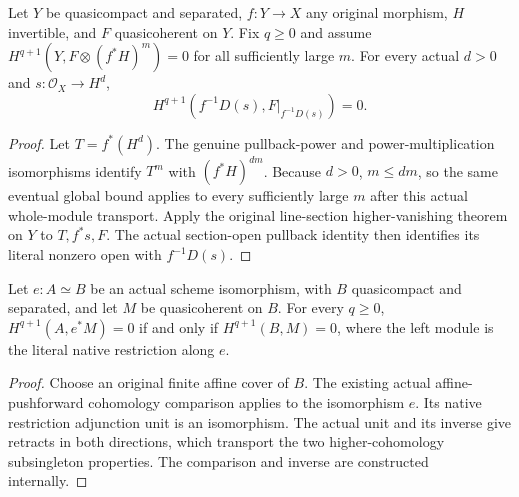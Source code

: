\begin{theorem}
\label{thm:proj-affine-positive-section-inverse-vanishing}
\leanok
Let $Y$ be quasicompact and separated, $f:Y\to X$ any original
morphism, $H$ invertible, and $F$ quasicoherent on $Y$.
Fix $q\geq0$ and assume
$H^{q+1}(Y,F\otimes(f^*H)^m)=0$ for all sufficiently large $m$.
For every actual $d>0$ and $s:\mathcal O_X\to H^d$,
\[
 H^{q+1}(f^{-1}D(s),F|_{f^{-1}D(s)})=0.
\]
\end{theorem}
\begin{proof}
Let $T=f^*(H^d)$. The genuine pullback-power and power-multiplication
isomorphisms identify $T^m$ with $(f^*H)^{dm}$. Because $d>0$,
$m\leq dm$, so the same eventual global bound applies to every
sufficiently large $m$ after this actual whole-module transport.
Apply the original line-section higher-vanishing theorem on $Y$ to
$T,f^*s,F$. The actual section-open pullback identity then identifies
its literal nonzero open with $f^{-1}D(s)$.
\end{proof}

\begin{lemma}
\label{lem:proj-affine-iso-restriction-higher-zero}
\leanok
Let $e:A\simeq B$ be an actual scheme isomorphism, with $B$
quasicompact and separated, and let $M$ be quasicoherent on $B$.
For every $q\geq0$,
$H^{q+1}(A,e^*M)=0$ if and only if $H^{q+1}(B,M)=0$, where the
left module is the literal native restriction along $e$.
\end{lemma}
\begin{proof}
Choose an original finite affine cover of $B$. The existing actual
affine-pushforward cohomology comparison applies to the isomorphism
$e$. Its native restriction adjunction unit is an isomorphism.
The actual unit and its inverse give retracts in both directions,
which transport the two higher-cohomology subsingleton properties.
The comparison and inverse are constructed internally.
\end{proof}

